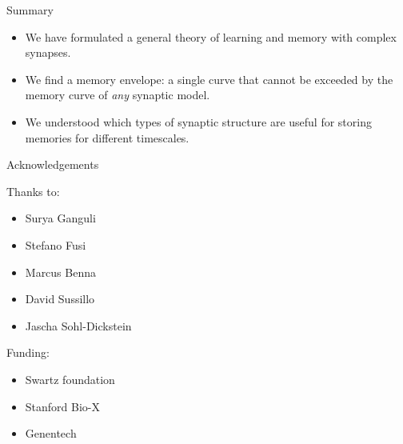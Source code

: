 \documentclass{beamer}%
\begin{document}
\begin{frame}{Summary}
%
  \begin{itemize}
    \item We have formulated a general theory of learning and memory with complex synapses.
    \vp\item We find a memory envelope: a single curve that cannot be exceeded by the memory curve of \emph{any} synaptic model.
    \vp\item We understood which types of synaptic structure are useful for storing memories for different timescales.
  \end{itemize}

%
\end{frame}





%
%
%

\begin{frame}{Acknowledgements}
%
\parbox[t]{0.4\linewidth}{
 Thanks to:
 \begin{itemize}
   \item Surya Ganguli
   \item Stefano Fusi
   \item Marcus Benna
   \item David Sussillo
   \item Jascha Sohl-Dickstein
 \end{itemize}
 }
\parbox[t]{0.4\linewidth}{
 Funding:
 \begin{itemize}
   \item Swartz foundation
   \item Stanford Bio-X
   \item Genentech
 \end{itemize}
 }
%
\end{frame}
\end{document}
